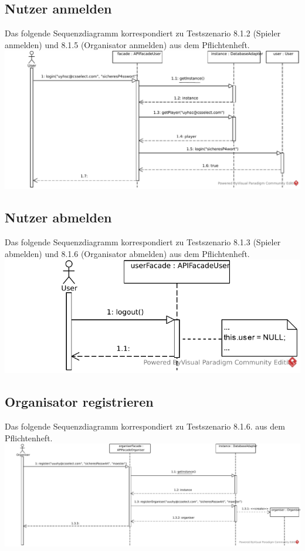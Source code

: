 \documentclass[a4paper]{scrreprt}
\begin{document}
    \subsection{Nutzer anmelden}
    Das folgende Sequenzdiagramm korrespondiert zu Testszenario 8.1.2 (Spieler anmelden) und 8.1.5 (Organisator anmelden) aus dem Pflichtenheft.\\
    \includegraphics[width=\textwidth]{img/SpielerAnmelden.pdf}

    \subsection{Nutzer abmelden}
    Das folgende Sequenzdiagramm korrespondiert zu Testszenario 8.1.3 (Spieler abmelden) und 8.1.6 (Organisator abmelden) aus dem Pflichtenheft. \\
    \includegraphics[width=\textwidth]{img/NutzerAbmelden.pdf}

    \subsection{Organisator registrieren}
    Das folgende Sequenzdiagramm korrespondiert zu Testszenario 8.1.6. aus dem Pflichtenheft. \\
    \includegraphics[width=\textwidth]{img/OrganisatorRegistrieren.pdf}
\end{document}
